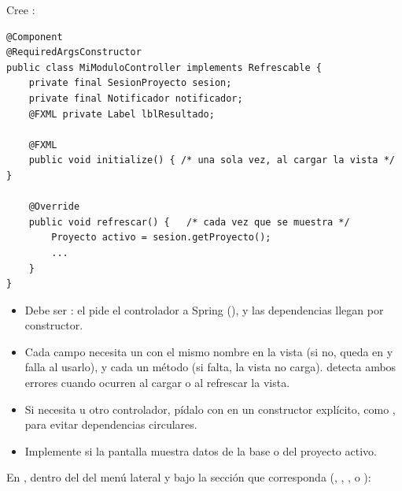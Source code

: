 \par\medskip\noindent{}\hspace{0.5em}{\bfseries Crear el controlador}\par\nopagebreak\smallskip

Cree :

\begin{verbatim}
@Component
@RequiredArgsConstructor
public class MiModuloController implements Refrescable {
    private final SesionProyecto sesion;
    private final Notificador notificador;
    @FXML private Label lblResultado;

    @FXML
    public void initialize() { /* una sola vez, al cargar la vista */ }

    @Override
    public void refrescar() {   /* cada vez que se muestra */
        Proyecto activo = sesion.getProyecto();
        ...
    }
}
\end{verbatim}

\begin{itemize}
	\item Debe ser : el  pide el controlador a Spring
	      (), y las dependencias llegan por constructor.
	\item Cada campo  necesita un  con el mismo nombre en la vista (si no, queda en 
	      y falla al usarlo), y cada  un método
	       (si falta, la vista no carga).  detecta ambos errores
	      cuando ocurren al cargar o al refrescar la vista.
	\item Si necesita  u otro controlador, pídalo con  en un constructor explícito, como
	      , para evitar dependencias circulares.
	\item Implemente  si la pantalla muestra datos de la base o del proyecto activo.
\end{itemize}

\par\medskip\noindent{}\hspace{0.5em}{\bfseries Agregar la entrada del menú}\par\nopagebreak\smallskip

En , dentro del  del menú lateral y bajo la sección que corresponda (,
, ,  o ):

